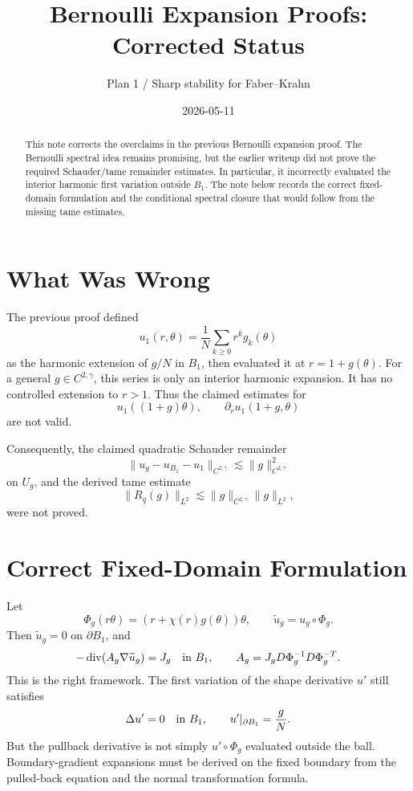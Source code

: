 \documentclass[11pt]{article}
\title{Bernoulli Expansion Proofs: Corrected Status}
\author{Plan 1 / Sharp stability for Faber--Krahn}
\date{2026-05-11}
\theoremstyle{definition}
\begin{document}
\maketitle

\begin{abstract}
This note corrects the overclaims in the previous Bernoulli expansion proof.
The Bernoulli spectral idea remains
promising, but the earlier writeup did not prove the required
Schauder/tame remainder estimates. In particular, it incorrectly evaluated the
interior harmonic first variation outside \(B_1\). The note below records the
correct fixed-domain formulation and the conditional spectral closure that
would follow from the missing tame estimates.
\end{abstract}

\section{What Was Wrong}

The previous proof defined
\[
u_1(r,\theta)=\frac1N\sum_{k\ge0}r^k g_k(\theta)
\]
as the harmonic extension of \(g/N\) in \(B_1\), then evaluated it at
\(r=1+g(\theta)\). For a general \(g\in C^{2,\gamma}\), this series is only an
interior harmonic expansion. It has no controlled extension to \(r>1\). Thus
the claimed estimates for
\[
u_1((1+g)\theta),\qquad \partial_r u_1(1+g,\theta)
\]
are not valid.

Consequently, the claimed quadratic Schauder remainder
\[
\|u_g-u_{B_1}-u_1\|_{C^{2,\gamma}}\lesssim \|g\|_{C^{2,\gamma}}^2
\]
on \(U_g\), and the derived tame estimate
\[
\|R_q(g)\|_{L^2}
\lesssim
\|g\|_{C^{2,\gamma}}\|g\|_{L^2},
\]
were not proved.

\section{Correct Fixed-Domain Formulation}

Let
\[
\Phi_g(r\theta)=(r+\chi(r)g(\theta))\theta,\qquad
\widetilde u_g=u_g\circ\Phi_g.
\]
Then \(\widetilde u_g=0\) on \(\partial B_1\), and
\[
-\operatorname{div}(A_g\nabla\widetilde u_g)=J_g
\quad\hbox{in }B_1,
\qquad
A_g=J_gD\Phi_g^{-1}D\Phi_g^{-T}.
\]
This is the right framework. The first variation of the shape derivative
\(u'\) still satisfies
\[
\Delta u'=0\quad\hbox{in }B_1,\qquad
u'|_{\partial B_1}=\frac{g}{N}.
\]
But the pullback derivative is not simply \(u'\circ\Phi_g\) evaluated outside
the ball. Boundary-gradient expansions must be derived on the fixed boundary
from the pulled-back equation and the normal transformation formula.
\end{document}
